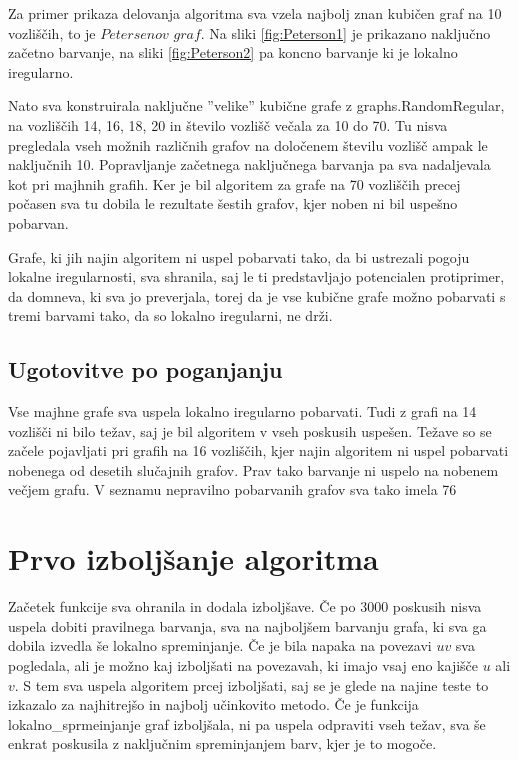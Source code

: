 \documentclass[12pt, a4paper]{article}
\begin{document}
Za primer prikaza delovanja algoritma sva vzela najbolj znan kubičen graf na 10 vozliščih, to je $Petersenov$ $graf$. Na sliki \ref{fig:Peterson1} je prikazano naključno začetno barvanje, na sliki \ref{fig:Peterson2} pa koncno barvanje ki je lokalno iregularno.

Nato sva konstruirala naključne ”velike” kubične grafe z graphs.RandomRegular, na vozliščih 14, 16, 18, 20 in število vozlišč večala za 10 do 70. Tu nisva pregledala vseh možnih različnih grafov na določenem številu vozlišč ampak le naključnih 10. Popravljanje začetnega naključnega barvanja pa sva nadaljevala kot pri majhnih grafih. Ker je bil algoritem za grafe na 70 vozliščih precej počasen sva tu dobila le rezultate šestih grafov, kjer noben ni bil uspešno pobarvan.

Grafe, ki jih najin algoritem ni uspel pobarvati tako, da bi ustrezali pogoju lokalne iregularnosti, sva shranila, saj le ti predstavljajo potencialen protiprimer, da domneva, ki sva jo preverjala, torej da je vse kubične grafe možno pobarvati s tremi barvami tako, da so lokalno iregularni, ne drži.

\subsection{Ugotovitve po poganjanju}

Vse majhne grafe sva uspela lokalno iregularno pobarvati. Tudi z grafi na 14 vozlišči ni bilo težav, saj je bil algoritem v vseh poskusih uspešen. Težave so se začele pojavljati pri grafih na 16 vozliščih, kjer najin algoritem ni uspel pobarvati nobenega od desetih slučajnih grafov. Prav tako barvanje ni uspelo na nobenem večjem grafu. V seznamu nepravilno pobarvanih grafov sva tako imela 76


\section{Prvo izboljšanje algoritma}

Začetek funkcije sva ohranila in dodala izboljšave. Če po 3000 poskusih nisva uspela dobiti pravilnega barvanja, sva na najboljšem barvanju grafa, ki sva ga dobila izvedla še lokalno spreminjanje. Če je bila napaka na povezavi $uv$ sva pogledala, ali je možno kaj izboljšati na povezavah, ki imajo vsaj eno kajišče $u$ ali $v$. S tem sva uspela algoritem prcej izboljšati, saj se je glede na najine teste to izkazalo za najhitrejšo in najbolj učinkovito metodo. Če je funkcija lokalno_sprmeinjanje graf izboljšala, ni pa uspela odpraviti vseh težav, sva še enkrat poskusila z naključnim spreminjanjem barv, kjer je to mogoče.
\end{document}
